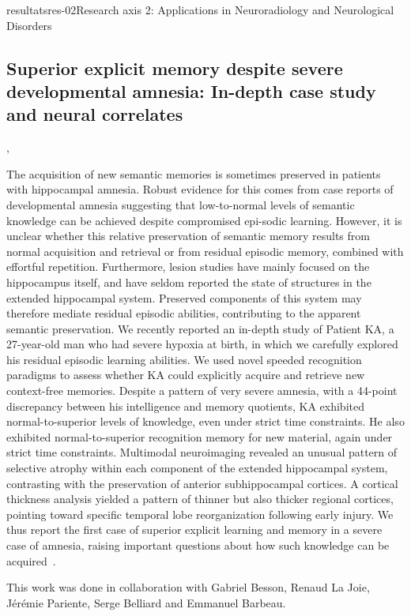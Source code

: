 \documentclass{ra2018}
\begin{document}
\begin{module}{resultats}{res-02}{Research axis 2: Applications in Neuroradiology and Neurological Disorders}
\subsection{Superior explicit memory despite severe developmental amnesia: In-depth case study and neural correlates}
\begin{participants}
      ,
\end{participants}
The acquisition of new semantic memories is sometimes preserved in patients with hippocampal amnesia. Robust evidence for this comes from case reports of developmental amnesia suggesting that low-to-normal levels of semantic knowledge can be achieved despite compromised epi-sodic learning. However, it is unclear whether this relative preservation of semantic memory results from normal acquisition and retrieval or from residual episodic memory, combined with effortful repetition. Furthermore, lesion studies have mainly focused on the hippocampus itself, and have seldom reported the state of structures in the extended hippocampal system. Preserved components of this system may therefore mediate residual episodic abilities, contributing to the apparent semantic preservation. We recently reported an in-depth study of Patient KA, a 27-year-old man who had severe hypoxia at birth, in which we carefully explored his residual episodic learning abilities. We used novel speeded recognition paradigms to assess whether KA could explicitly acquire and retrieve new context-free memories. Despite a pattern of very severe amnesia, with a 44-point discrepancy between his intelligence and memory quotients, KA exhibited normal-to-superior levels of knowledge, even under strict time constraints. He also exhibited normal-to-superior recognition memory for new material, again under strict time constraints. Multimodal neuroimaging revealed an unusual pattern of selective atrophy within each component of the extended hippocampal system, contrasting with the preservation of anterior subhippocampal cortices. A cortical thickness analysis yielded a pattern of thinner but also thicker regional cortices, pointing toward specific temporal lobe reorganization following early injury. We thus report the first case of superior explicit learning and memory in a severe case of amnesia, raising important questions about how such knowledge can be acquired~\cite{jonin:inserm-01916086}.

This work was done in collaboration with Gabriel Besson, Renaud La Joie, Jérémie Pariente, Serge Belliard and Emmanuel Barbeau.


\end{module}
\end{document}
